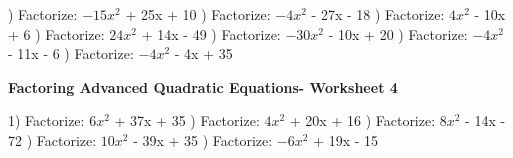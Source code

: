 \documentclass{article}%
\begin{document}
\newline%
\newline%
) Factorize: $-15x^2$ + 25x + 10%
\newline%
\newline%
) Factorize: $-4x^2$ - 27x - 18%
\newline%
\newline%
) Factorize: $4x^2$ - 10x + 6%
\newline%
\newline%
) Factorize: $24x^2$ + 14x - 49%
\newline%
\newline%
) Factorize: $-30x^2$ - 10x + 20%
\newline%
\newline%
) Factorize: $-4x^2$ - 11x - 6%
\newline%
\newline%
) Factorize: $-4x^2$ - 4x + 35%
\newline%
\newline%
\newline%
\pagebreak%
\large%
\begin{center}%
\textbf{Factoring Advanced Quadratic Equations- Worksheet 4}%
\newline%
\newline%
\newline%
\end{center} \normalsize%
1) Factorize: $6x^2$ + 37x + 35%
\newline%
\newline%
) Factorize: $4x^2$ + 20x + 16%
\newline%
\newline%
) Factorize: $8x^2$ - 14x - 72%
\newline%
\newline%
) Factorize: $10x^2$ - 39x + 35%
\newline%
\newline%
) Factorize: $-6x^2$ + 19x - 15%
\newline%
\end{document}
